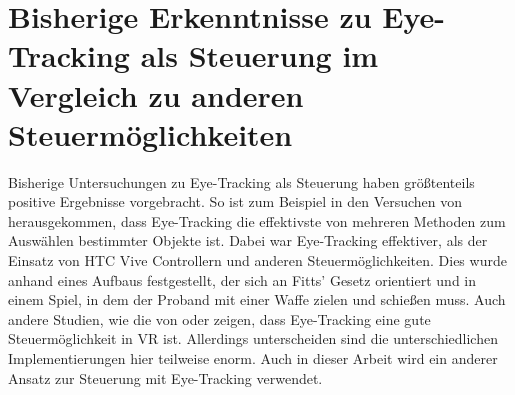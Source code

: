 \section{Bisherige Erkenntnisse zu Eye-Tracking als Steuerung im Vergleich zu anderen Steuermöglichkeiten}
Bisherige Untersuchungen zu Eye-Tracking als Steuerung haben größtenteils positive Ergebnisse vorgebracht. So ist zum Beispiel in den Versuchen von \citeauthor{Pai.2019} herausgekommen, dass Eye-Tracking die effektivste von mehreren Methoden zum Auswählen bestimmter Objekte ist. Dabei war Eye-Tracking effektiver, als der Einsatz von HTC Vive Controllern und anderen Steuermöglichkeiten. Dies wurde anhand eines Aufbaus festgestellt, der sich an Fitts' Gesetz orientiert und in einem Spiel, in dem der Proband mit einer Waffe zielen und schießen muss\cite{Pai.2019}.
Auch andere Studien, wie die von \citeauthor{D.Kumar.2016} oder \citeauthor{R.Atienza.2016} zeigen, dass Eye-Tracking eine gute Steuermöglichkeit in VR ist. Allerdings unterscheiden sind die unterschiedlichen Implementierungen hier teilweise enorm\cite{Pai.2019}\cite{R.Atienza.2016}\cite{D.Kumar.2016}. Auch in dieser Arbeit wird ein anderer Ansatz zur Steuerung mit Eye-Tracking verwendet.

